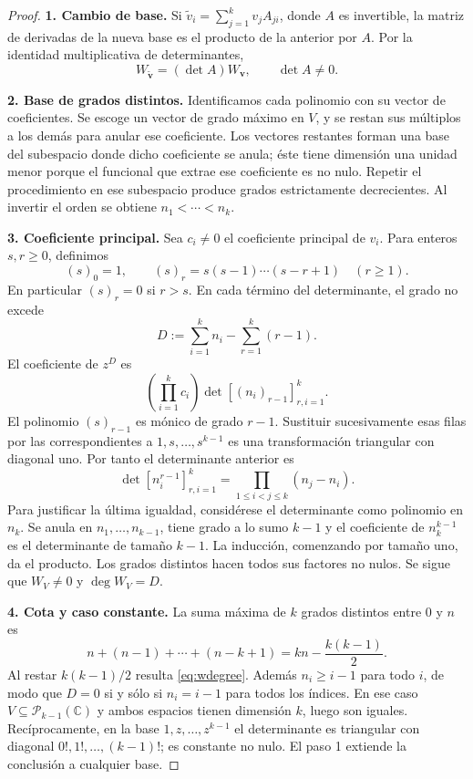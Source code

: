 \documentclass[11pt,a4paper]{article}
\numberwithin{equation}{section}
\theoremstyle{definition}
\theoremstyle{remark}
\newcommand{\C}{\mathbb C}
\newcommand{\PP}{\mathcal P}
\newcommand{\paso}[1]{\par\smallskip\noindent\textbf{#1}\quad}
\begin{document}
\begin{proof}
\paso{1. Cambio de base.}
Si $\widetilde v_i=\sum_{j=1}^kv_jA_{ji}$, donde $A$ es invertible, la matriz de derivadas de la nueva base es el producto de la anterior por $A$. Por la identidad multiplicativa de determinantes,
\[
W_{\widetilde{\boldsymbol v}}=(\det A)W_{\boldsymbol v},\qquad \det A\ne0.
\]

\paso{2. Base de grados distintos.}
Identificamos cada polinomio con su vector de coeficientes. Se escoge un vector de grado máximo en $V$, y se restan sus múltiplos a los demás para anular ese coeficiente. Los vectores restantes forman una base del subespacio donde dicho coeficiente se anula; éste tiene dimensión una unidad menor porque el funcional que extrae ese coeficiente es no nulo. Repetir el procedimiento en ese subespacio produce grados estrictamente decrecientes. Al invertir el orden se obtiene $n_1<\cdots<n_k$.

\paso{3. Coeficiente principal.}
Sea $c_i\ne0$ el coeficiente principal de $v_i$. Para enteros $s,r\ge0$, definimos
\[
(s)_0=1,\qquad (s)_r=s(s-1)\cdots(s-r+1)\quad(r\ge1).
\]
En particular $(s)_r=0$ si $r>s$. En cada término del determinante, el grado no excede
\[
D:=\sum_{i=1}^kn_i-\sum_{r=1}^k(r-1).
\]
El coeficiente de $z^D$ es
\[
\left(\prod_{i=1}^kc_i\right)\det[(n_i)_{r-1}]_{r,i=1}^k.
\]
El polinomio $(s)_{r-1}$ es mónico de grado $r-1$. Sustituir sucesivamente esas filas por las correspondientes a $1,s,\ldots,s^{k-1}$ es una transformación triangular con diagonal uno. Por tanto el determinante anterior es
\[
\det[n_i^{r-1}]_{r,i=1}^k=\prod_{1\le i<j\le k}(n_j-n_i).
\]
Para justificar la última igualdad, considérese el determinante como polinomio en $n_k$. Se anula en $n_1,\ldots,n_{k-1}$, tiene grado a lo sumo $k-1$ y el coeficiente de $n_k^{k-1}$ es el determinante de tamaño $k-1$. La inducción, comenzando por tamaño uno, da el producto. Los grados distintos hacen todos sus factores no nulos. Se sigue que $W_V\ne0$ y $\deg W_V=D$.

\paso{4. Cota y caso constante.}
La suma máxima de $k$ grados distintos entre $0$ y $n$ es
\[
n+(n-1)+\cdots+(n-k+1)=kn-\frac{k(k-1)}2.
\]
Al restar $k(k-1)/2$ resulta \eqref{eq:wdegree}. Además $n_i\ge i-1$ para todo $i$, de modo que $D=0$ si y sólo si $n_i=i-1$ para todos los índices. En ese caso $V\subseteq\PP_{k-1}(\C)$ y ambos espacios tienen dimensión $k$, luego son iguales. Recíprocamente, en la base $1,z,\ldots,z^{k-1}$ el determinante es triangular con diagonal $0!,1!,\ldots,(k-1)!$; es constante no nulo. El paso 1 extiende la conclusión a cualquier base.
\end{proof}
\end{document}
